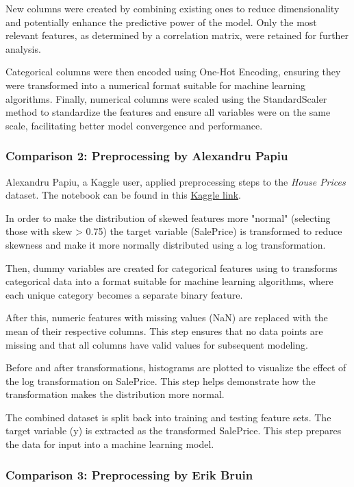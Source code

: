 New columns were created by combining existing ones to reduce dimensionality
and potentially enhance the predictive power of the model. Only the most
relevant features, as determined by a correlation matrix, were retained for
further analysis.

Categorical columns were then encoded using One-Hot Encoding, ensuring they
were transformed into a numerical format suitable for machine learning
algorithms. Finally, numerical columns were scaled using the StandardScaler
method to standardize the features and ensure all variables were on the same
scale, facilitating better model convergence and performance.

\subsubsection{Comparison 2: Preprocessing by Alexandru Papiu}

Alexandru Papiu, a Kaggle user, applied preprocessing steps to the
\textit{House Prices} dataset. The notebook can be found in this
\href{https://www.kaggle.com/code/apapiu/regularized-linear-models}{Kaggle
    link}.

In order to make the distribution of skewed features more "normal" (selecting
those with skew > 0.75) the target variable (SalePrice) is transformed to
reduce skewness and make it more normally distributed using a log
transformation.

Then, dummy variables are created for categorical features using to transforms
categorical data into a format suitable for machine learning algorithms, where
each unique category becomes a separate binary feature.

After this, numeric features with missing values (NaN) are replaced with the
mean of their respective columns. This step ensures that no data points are
missing and that all columns have valid values for subsequent modeling.

Before and after transformations, histograms are plotted to visualize the
effect of the log transformation on SalePrice. This step helps demonstrate how
the transformation makes the distribution more normal.

The combined dataset is split back into training and testing feature sets. The
target variable (y) is extracted as the transformed SalePrice. This step
prepares the data for input into a machine learning model.

\subsubsection{Comparison 3: Preprocessing by Erik Bruin}

